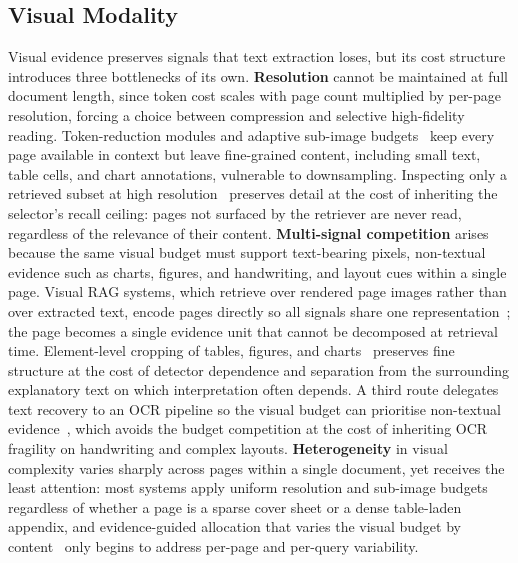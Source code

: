 \subsection{Visual Modality}
\label{sec:modality-visual}
Visual evidence preserves signals that text extraction loses, but its cost structure introduces three bottlenecks of its own. \textbf{Resolution} cannot be maintained at full document length, since token cost scales with page count multiplied by per-page resolution, forcing a choice between compression and selective high-fidelity reading. Token-reduction modules and adaptive sub-image budgets~\cite{hu2025mplug, yu2024texthawk2, jia2025leopard} keep every page available in context but leave fine-grained content, including small text, table cells, and chart annotations, vulnerable to downsampling. Inspecting only a retrieved subset at high resolution~\cite{zhu2026doclens, jain2025simpledoc} preserves detail at the cost of inheriting the selector's recall ceiling: pages not surfaced by the retriever are never read, regardless of the relevance of their content. \textbf{Multi-signal competition} arises because the same visual budget must support text-bearing pixels, non-textual evidence such as charts, figures, and handwriting, and layout cues within a single page. Visual RAG systems, which retrieve over rendered page images rather than over extracted text, encode pages directly so all signals share one representation~\cite{cho2024m3docrag, tanaka2025vdocrag}; the page becomes a single evidence unit that cannot be decomposed at retrieval time. Element-level cropping of tables, figures, and charts~\cite{zhu2026doclens} preserves fine structure at the cost of detector dependence and separation from the surrounding explanatory text on which interpretation often depends. A third route delegates text recovery to an OCR pipeline so the visual budget can prioritise non-textual evidence~\cite{hannan2026docslm}, which avoids the budget competition at the cost of inheriting OCR fragility on handwriting and complex layouts. \textbf{Heterogeneity} in visual complexity varies sharply across pages within a single document, yet receives the least attention: most systems apply uniform resolution and sub-image budgets regardless of whether a page is a sparse cover sheet or a dense table-laden appendix, and evidence-guided allocation that varies the visual budget by content~\cite{yan2026docseeker} only begins to address per-page and per-query variability.

